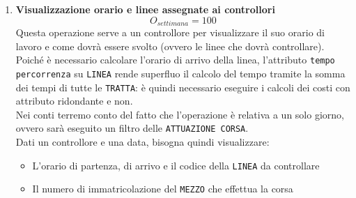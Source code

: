 \documentclass[12pt,a4paper]{report}
\begin{document}
\begin{enumerate}[label=\textbf{\arabic*}]

    \item \textbf{Visualizzazione orario e linee assegnate ai controllori} \label{op5} \\
    \[ {O_{settimana} = 100} \]
    Questa operazione serve a un controllore per visualizzare il suo orario di lavoro e come dovrà essere svolto (ovvero le linee che dovrà controllare). Poiché è necessario calcolare l'orario di arrivo della linea, l'attributo \texttt{tempo percorrenza} su \texttt{LINEA} rende superfluo il calcolo del tempo tramite la somma dei tempi di tutte le \texttt{TRATTA}: è quindi necessario eseguire i calcoli dei costi con attributo ridondante e non. \\
    Nei conti terremo conto del fatto che l'operazione è relativa a un solo giorno, ovvero sarà eseguito un filtro delle \texttt{ATTUAZIONE CORSA}. \\
    Dati un controllore e una data, bisogna quindi visualizzare:
    \begin{itemize}
    \renewcommand\labelitemi{--}
    \item L'orario di partenza, di arrivo e il codice della \texttt{LINEA} da controllare
    \item Il numero di immatricolazione del \texttt{MEZZO} che effettua la corsa
    \end{itemize}


\end{enumerate}
\end{document}
